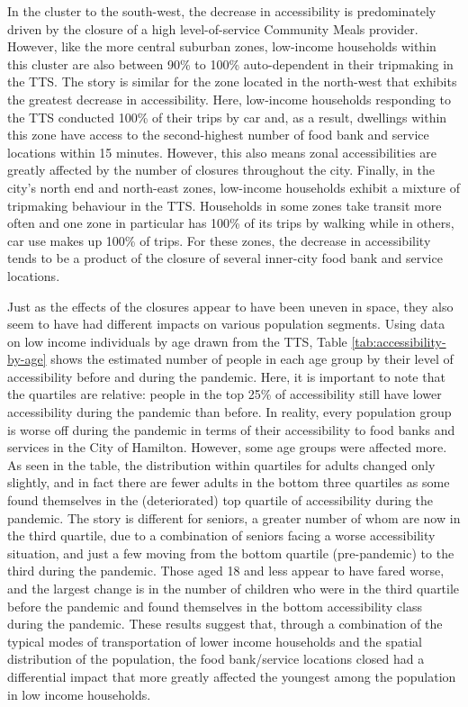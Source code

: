 \documentclass[]{elsarticle} %
\begin{document}
In the cluster to the south-west, the decrease in accessibility is
predominately driven by the closure of a high level-of-service Community
Meals provider. However, like the more central suburban zones,
low-income households within this cluster are also between 90\% to 100\%
auto-dependent in their tripmaking in the TTS. The story is similar for
the zone located in the north-west that exhibits the greatest decrease
in accessibility. Here, low-income households responding to the TTS
conducted 100\% of their trips by car and, as a result, dwellings within
this zone have access to the second-highest number of food bank and
service locations within 15 minutes. However, this also means zonal
accessibilities are greatly affected by the number of closures
throughout the city. Finally, in the city's north end and north-east
zones, low-income households exhibit a mixture of tripmaking behaviour
in the TTS. Households in some zones take transit more often and one
zone in particular has 100\% of its trips by walking while in others,
car use makes up 100\% of trips. For these zones, the decrease in
accessibility tends to be a product of the closure of several inner-city
food bank and service locations.

Just as the effects of the closures appear to have been uneven in space,
they also seem to have had different impacts on various population
segments. Using data on low income individuals by age drawn from the
TTS, Table \ref{tab:accessibility-by-age} shows the estimated number of
people in each age group by their level of accessibility before and
during the pandemic. Here, it is important to note that the quartiles
are relative: people in the top 25\% of accessibility still have lower
accessibility during the pandemic than before. In reality, every
population group is worse off during the pandemic in terms of their
accessibility to food banks and services in the City of Hamilton.
However, some age groups were affected more. As seen in the table, the
distribution within quartiles for adults changed only slightly, and in
fact there are fewer adults in the bottom three quartiles as some found
themselves in the (deteriorated) top quartile of accessibility during
the pandemic. The story is different for seniors, a greater number of
whom are now in the third quartile, due to a combination of seniors
facing a worse accessibility situation, and just a few moving from the
bottom quartile (pre-pandemic) to the third during the pandemic. Those
aged 18 and less appear to have fared worse, and the largest change is
in the number of children who were in the third quartile before the
pandemic and found themselves in the bottom accessibility class during
the pandemic. These results suggest that, through a combination of the
typical modes of transportation of lower income households and the
spatial distribution of the population, the food bank/service locations
closed had a differential impact that more greatly affected the youngest
among the population in low income households.
\end{document}
